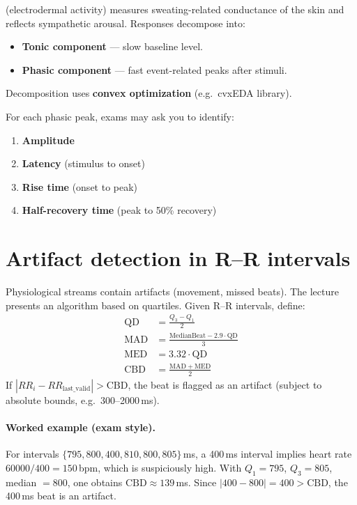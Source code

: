  (electrodermal activity) measures sweating-related conductance of the skin and reflects sympathetic arousal. Responses decompose into:
\begin{itemize}
  \item \textbf{Tonic component} --- slow baseline level.
  \item \textbf{Phasic component} --- fast event-related peaks after stimuli.
\end{itemize}
Decomposition uses \textbf{convex optimization} (e.g.\ cvxEDA library).

For each phasic peak, exams may ask you to identify:
\begin{enumerate}
  \item \textbf{Amplitude}
  \item \textbf{Latency} (stimulus to onset)
  \item \textbf{Rise time} (onset to peak)
  \item \textbf{Half-recovery time} (peak to 50\% recovery)
\end{enumerate}

\section{Artifact detection in R--R intervals}

Physiological streams contain artifacts (movement, missed beats). The lecture presents an algorithm based on quartiles. Given R--R intervals, define:
\begin{align*}
\mathrm{QD} &= \frac{Q_3 - Q_1}{2} \\
\mathrm{MAD} &= \frac{\mathrm{MedianBeat} - 2.9 \cdot \mathrm{QD}}{3} \\
\mathrm{MED} &= 3.32 \cdot \mathrm{QD} \\
\mathrm{CBD} &= \frac{\mathrm{MAD} + \mathrm{MED}}{2}
\end{align*}
If $|RR_i - RR_{\mathrm{last\_valid}}| > \mathrm{CBD}$, the beat is flagged as an artifact (subject to absolute bounds, e.g.\ 300--2000\,ms).

\paragraph{Worked example (exam style).}
For intervals $\{795,800,400,810,800,805\}$\,ms, a 400\,ms interval implies heart rate $60000/400 = 150$\,bpm, which is suspiciously high. With $Q_1=795$, $Q_3=805$, median $=800$, one obtains $\mathrm{CBD}\approx 139$\,ms. Since $|400-800| = 400 > \mathrm{CBD}$, the 400\,ms beat is an artifact.

